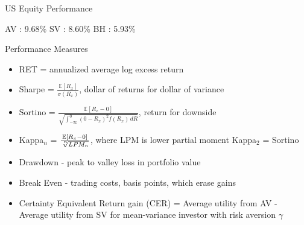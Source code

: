 \documentclass{beamer}
\begin{document}
\begin{frame}{US Equity Performance}
	\begin{figure}
		\resizebox{11cm}{6.5cm}{}
	\end{figure}
	\centering
	AV : 9.68\%  SV : 8.60\%  BH : 5.93\%
\end{frame}

\begin{frame}{Performance Measures}
	\begin{itemize}[<+->]
		\item RET = annualized average log excess return
		\item Sharpe = $\frac{\mathbb{E}[R_{x}]}{\sigma(R_{x})}$, dollar of returns for dollar of variance
		\item Sortino = $\frac{\mathbb{E}[R_{x} - 0]}{\sqrt  {\int _{{-\infty }}^{0}(0-R_{x})^{2}f(R_{x})\,dR}}$, return for downside
		\item Kappa$_{n}$ = $\frac{\mathbb{E}[R_{x} - 0]}{\sqrt[\leftroot{-2}\uproot{2}n]{LPM_{n}}}$, where LPM is lower partial moment Kappa$_{2}$ = Sortino
		\item Drawdown - peak to valley loss in portfolio value
		\item Break Even - trading costs, basis points, which erase gains
		\item Certainty Equivalent Return gain (CER) = Average utility from AV - Average utility from SV for mean-variance investor with risk aversion $\gamma$
	\end{itemize}
\end{frame}

%		
\end{document}
